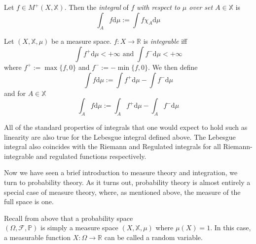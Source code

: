 \begin{definition}
    Let $f\in M^+(X,\mathbb{X})$. Then the \emph{integral} of $f$
    \emph{with respect to $\mu$ over set $A\in \mathbb{X}$} is
    \begin{equation*}
        \int_A f\mathrm d\mu:=\int f\chi_A\mathrm d\mu
    \end{equation*}
\end{definition}

\begin{definition}
    Let $(X,\mathbb{X},\mu)$ be a measure space. $f:X\rightarrow\mathbb{R}$
    is \emph{integrable} iff 
    \begin{equation*}
        \int f^+\mathrm d\mu<+\infty \textrm{ and }\int f^-\mathrm d\mu<+\infty
    \end{equation*}
    where $f^+:=\max\{f,0\}$ and $f^-:=-\min\{f,0\}$.
    We then define
    \begin{equation*}
        \int f\mathrm d\mu:=\int f^+\mathrm d\mu -\int f^-\mathrm d\mu
    \end{equation*}
    and for $A\in\mathbb{X}$
    \begin{equation*}
        \int_A f\mathrm d\mu:=\int_A f^+\mathrm d\mu -\int_A f^-\mathrm d\mu
    \end{equation*}
\end{definition}

\begin{remark}
    All of the standard properties of integrals that one would expect
    to hold such as linearity are also true for the Lebesgue integral 
    defined above. The Lebesgue integral also coincides with the Riemann
    and Regulated integrals for all Riemann-integrable and regulated functions respectively.
\end{remark}

Now we have seen a brief introduction to measure theory and integration, we turn to 
probability theory. As it turns out, probability theory is almost entirely a special
case of measure theory, where, as mentioned above, the measure of the full space is one.

\begin{definition}
    Recall from above that a probability space \\$(\Omega,\mathcal{F},\mathbb{P})$
    is simply a measure space $(X,\mathbb{X},\mu)$ where $\mu(X)=1.$ In this case,
    a measurable function $X:\Omega\rightarrow\mathbb{R}$ can be called
    a random variable. 
\end{definition}

